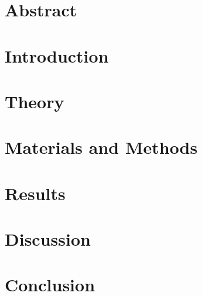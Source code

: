\documentclass[a4paper, 12pt]{article}
\begin{document}


\newpage
\section*{Abstract}



\newpage
\tableofcontents

\newpage
\section{Introduction}



\newpage
\section{Theory}



\newpage
\section{Materials and Methods}



\newpage
\section{Results}



\newpage
\section{Discussion}



\newpage
\section{Conclusion}
\end{document}
